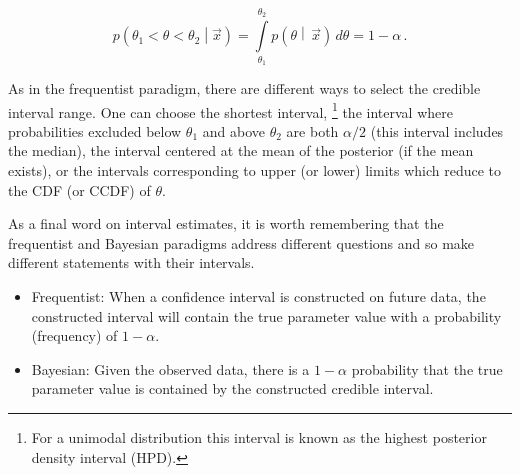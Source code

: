 \begin{equation}
 p\left(\theta_{1} < \theta < \theta_{2}\middle|\vec{x}\right) = \int\limits_{\theta_{1}}^{\theta_{2}} p\left(\theta\middle|\,\vec{x}\right)\,d\theta = 1-\alpha\,.
 \label{eq:credible_interval_coverage}
\end{equation}

As in the frequentist paradigm, there are different ways to select the credible interval range.
One can choose the shortest interval,%
\footnote{For a unimodal distribution this interval is known as the highest posterior density interval (HPD).}
the interval where probabilities excluded below $\theta_{1}$ and above $\theta_{2}$ are both $\alpha/2$ (this interval includes the median), the interval centered at the mean of the posterior (if the mean exists), or the intervals corresponding to upper (or lower) limits which reduce  to the CDF (or CCDF) of $\theta$.

As a final word on interval estimates, it is worth remembering that the frequentist and Bayesian paradigms address different questions and so make different statements with their intervals.
\begin{itemize}
 \item Frequentist: When a confidence interval is constructed on future data, the constructed interval will contain the true parameter value with a probability (frequency) of $1-\alpha$.
 \item Bayesian: Given the observed data, there is a $1-\alpha$ probability that the true parameter value is contained by the constructed credible interval.
\end{itemize}
